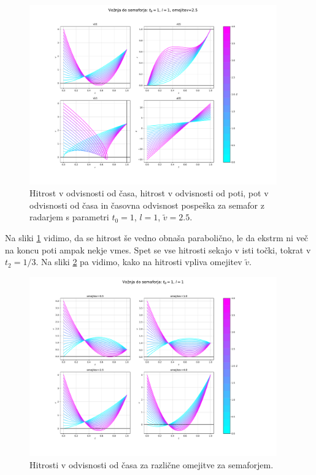 \documentclass[a4paper, 12pt, slovene]{article}
\numberwithin{equation}{section}
\begin{document}
\begin{figure}[H]
\centering
\includegraphics[width=0.95\textwidth]{grafi/dim_radar_1_1_2.5.pdf}
\caption{Hitrost v odvisnosti od časa, hitrost v odvisnosti od poti, pot v odvisnosti od časa in časovna odvisnost pospeška za semafor z radarjem s parametri $t_0=1$, $l=1$, $\tilde{v}=2.5$.}
\label{f:radar-4graf}
\end{figure}

Na sliki \ref{f:radar-4graf} vidimo, da se hitrost še vedno obnaša parabolično, le da ekstrm ni več na koncu poti ampak nekje vmes. Spet se vse hitrosti sekajo v isti točki, tokrat v $t_2 = 1/3$. Na sliki \ref{f:radar-omejitve} pa vidimo, kako na hitrosti vpliva omejitev $\tilde{v}$.

\begin{figure}[H]
\centering
\includegraphics[width=0.95\textwidth]{grafi/dim_radar_1_1_omejitve.pdf}
\caption{Hitrosti v odvisnosti od časa za različne omejitve za semaforjem.}
\label{f:radar-omejitve}
\end{figure}
\end{document}

